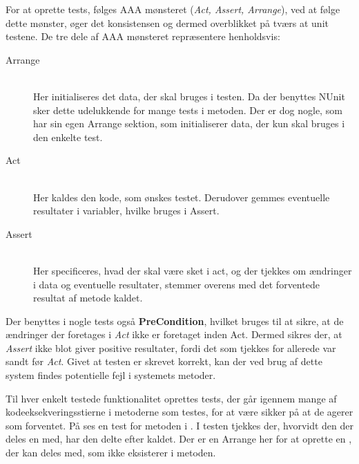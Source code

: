 For at oprette tests, følges AAA mønsteret (\textit{Act, Assert, Arrange}), ved at følge dette mønster, øger det konsistensen og dermed overblikket på tværs at unit testene.
\citep{Writing_Your_Tests}
De tre dele af AAA mønsteret repræsentere henholdsvis:
\begin{description}
  \item[Arrange]\hfill\\ 
  Her initialiseres det data, der skal bruges i testen. 
  Da der benyttes NUnit sker dette udelukkende for mange tests i  metoden.
  Der er dog nogle, som har sin egen Arrange sektion, som initialiserer data, der kun skal bruges i den enkelte test.
  \item[Act]\hfill\\ 
  Her kaldes den kode, som ønskes testet.
  Derudover gemmes eventuelle resultater i variabler, hvilke bruges i Assert.
  \item[Assert]\hfill\\
  Her specificeres, hvad der skal være sket i act, og der tjekkes om ændringer i data og eventuelle resultater, stemmer overens med det forventede resultat af metode kaldet.
\end{description}
Der benyttes i nogle tests også \textbf{PreCondition}, hvilket bruges til at sikre, at de ændringer der foretages i \textit{Act} ikke er foretaget inden Act. 
Dermed sikres der, at \textit{Assert} ikke blot giver positive resultater, fordi det som tjekkes for allerede var sandt før \textit{Act}.
Givet at testen er skrevet korrekt, kan der ved brug af dette system findes potentielle fejl i systemets metoder.


Til hver enkelt testede funktionalitet oprettes tests, der går igennem mange af kodeeksekveringsstierne i metoderne som testes, for at være sikker på at de agerer som forventet.
På  ses en test for metoden  i . 
I testen tjekkes der, hvorvidt den  der deles en  med, har den delte  efter kaldet.
Der er en Arrange her for at oprette en , der kan deles med, som ikke eksisterer i  metoden.

